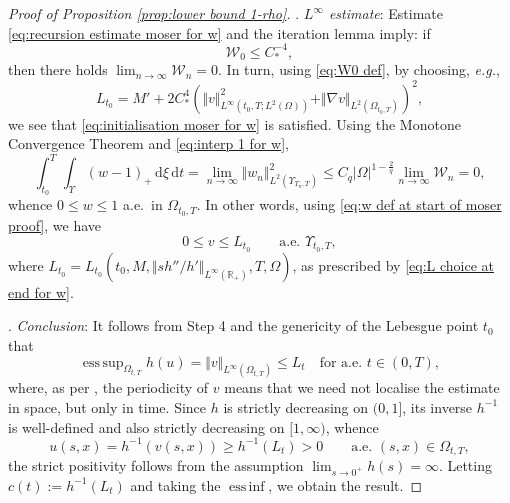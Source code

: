 \documentclass[11pt,a4paper,reqno]{amsart}
\theoremstyle{remark}
\theoremstyle{definition}
\numberwithin{equation}{section}
\DeclareMathOperator{\esssup}{ess \, sup}
\DeclareMathOperator{\essinf}{ess \, inf}
\newcommand{\bxi}{\xi}
\renewcommand{\d}{\, \mathrm{d} }
\begin{document}
\begin{proof}[Proof of Proposition \ref{prop:lower bound 1-rho}]
\smallskip 

. \textit{$L^\infty$ estimate}: Estimate \eqref{eq:recursion estimate moser for w} and the iteration lemma \cite[\S 1, Lemma 4.1]{DiBenedetto} imply: if 
\begin{equation}\label{eq:initialisation moser for w}
    \mathscr{W}_0 \leq C_*^{-4}, 
\end{equation}
then there holds $\lim_{n\to\infty}\mathscr{W}_n = 0$. In turn, using \eqref{eq:W0 def}, by choosing, \textit{e.g.}, 
\begin{equation}\label{eq:L choice at end for w}
    L_{t_0} = M' + 2 C_*^{4}(\Vert v \Vert_{L^\infty(t_0,T;L^2(\Omega))}^2 + \Vert \nabla v \Vert_{L^2(\Omega_{t_0,T})})^2, 
\end{equation}
we see that \eqref{eq:initialisation moser for w} is satisfied. Using the Monotone Convergence Theorem and \eqref{eq:interp 1 for w}, 
\begin{equation*}
    \int_{t_0}^T \int_\Upsilon (w-1)_+ \d \bxi \d t = \lim_{n\to\infty} \Vert w_n \Vert^2_{L^2(\Upsilon_{T_n,T})} \leq C_q |\Omega|^{1-\frac{2}{q}} \lim_{n\to\infty}\mathscr{W}_n = 0, 
\end{equation*}
whence $0 \leq w \leq 1$ a.e.~in $\Omega_{t_0,T}$. In other words, using \eqref{eq:w def at start of moser proof}, we have 
\begin{equation*}
    0 \leq v \leq L_{t_0} \qquad \text{a.e.~} \Upsilon_{t_0,T}, 
\end{equation*}
where $L_{t_0} = L_{t_0}(t_0,M, \Vert s h''/h'\Vert_{L^\infty(\mathbb{R}_+)} , T , \Omega)$, as prescribed by \eqref{eq:L choice at end for w}. 

    \smallskip 

    . \textit{Conclusion}: It follows from Step 4 and the genericity of the Lebesgue point $t_0$ that 
\begin{equation}\label{eq: Linfty bound w}
   \esssup_{\Omega_{t,T}} h(u) = \Vert v \Vert_{L^\infty(\Omega_{t,T})} \leq L_t \quad \text{for a.e.~} t \in (0,T),
\end{equation}
where, as per \cite[\S 3]{reg1}, the periodicity of $v$ means that we need not localise the estimate in space, but only in time. Since $h$ is strictly decreasing on $(0,1]$, its inverse $h^{-1}$ is well-defined and also strictly decreasing on $[1,\infty)$, whence 
\begin{equation*}
    u(s,x) = h^{-1}(v(s,x)) \geq h^{-1}(L_t) > 0 \qquad \text{a.e.~}(s,x) \in \Omega_{t,T}, 
\end{equation*}
the strict positivity follows from the assumption $\lim_{s \to 0^+} h(s) = \infty$. Letting $c(t) := h^{-1}(L_t)$ and taking the $\essinf$, we obtain the result. 
\end{proof}
\end{document}
